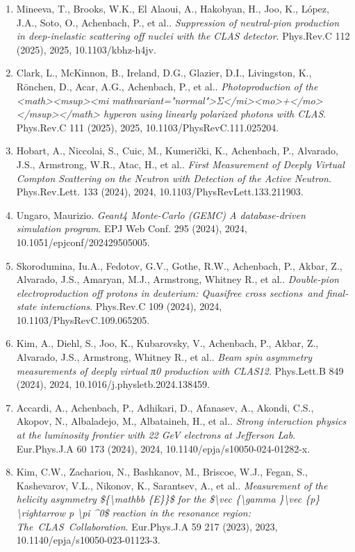 \begin{enumerate}
\item Mineeva, T., Brooks, W.K., El Alaoui, A., Hakobyan, H., Joo, K., López, J.A., Soto, O., Achenbach, P., et al.. \textit{Suppression of neutral-pion production in deep-inelastic scattering off nuclei with the CLAS detector}. Phys.Rev.C 112 (2025), 2025, 10.1103/kbhz-h4jv.
\item Clark, L., McKinnon, B., Ireland, D.G., Glazier, D.I., Livingston, K., Rönchen, D., Acar, A.G., Achenbach, P., et al.. \textit{Photoproduction of the <math><msup><mi mathvariant="normal">Σ</mi><mo>+</mo></msup></math> hyperon using linearly polarized photons with CLAS}. Phys.Rev.C 111 (2025), 2025, 10.1103/PhysRevC.111.025204.
\item Hobart, A., Niccolai, S., Cuic, M., Kumerički, K., Achenbach, P., Alvarado, J.S., Armstrong, W.R., Atac, H., et al.. \textit{First Measurement of Deeply Virtual Compton Scattering on the Neutron with Detection of the Active Neutron}. Phys.Rev.Lett. 133 (2024), 2024, 10.1103/PhysRevLett.133.211903.
\item Ungaro, Maurizio. \textit{Geant4 Monte-Carlo (GEMC) A database-driven simulation program}. EPJ Web Conf. 295 (2024), 2024, 10.1051/epjconf/202429505005.
\item Skorodumina, Iu.A., Fedotov, G.V., Gothe, R.W., Achenbach, P., Akbar, Z., Alvarado, J.S., Amaryan, M.J., Armstrong, Whitney R., et al.. \textit{Double-pion electroproduction off protons in deuterium: Quasifree cross sections and final-state interactions}. Phys.Rev.C 109 (2024), 2024, 10.1103/PhysRevC.109.065205.
\item Kim, A., Diehl, S., Joo, K., Kubarovsky, V., Achenbach, P., Akbar, Z., Alvarado, J.S., Armstrong, Whitney R., et al.. \textit{Beam spin asymmetry measurements of deeply virtual π0 production with CLAS12}. Phys.Lett.B 849 (2024), 2024, 10.1016/j.physletb.2024.138459.
\item Accardi, A., Achenbach, P., Adhikari, D., Afanasev, A., Akondi, C.S., Akopov, N., Albaladejo, M., Albataineh, H., et al.. \textit{Strong interaction physics at the luminosity frontier with 22 GeV electrons at Jefferson Lab}. Eur.Phys.J.A 60 173 (2024), 2024, 10.1140/epja/s10050-024-01282-x.
\item Kim, C.W., Zachariou, N., Bashkanov, M., Briscoe, W.J., Fegan, S., Kashevarov, V.L., Nikonov, K., Sarantsev, A., et al.. \textit{Measurement of the helicity asymmetry \$\{\textbackslash{}mathbb \{E\}\}\$ for the \$\textbackslash{}vec \{\textbackslash{}gamma \}\textbackslash{}vec \{p\} \textbackslash{}rightarrow p \textbackslash{}pi \textasciicircum{}0\$ reaction in the resonance region: The CLAS Collaboration}. Eur.Phys.J.A 59 217 (2023), 2023, 10.1140/epja/s10050-023-01123-3.

\end{enumerate}
